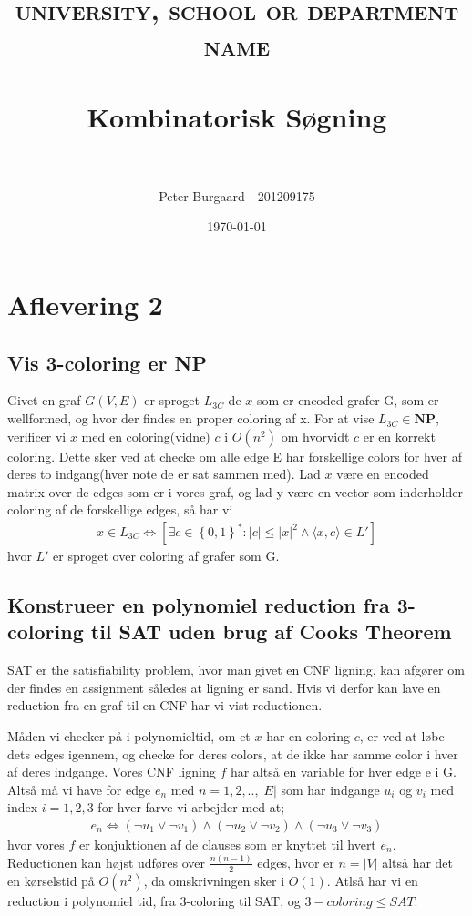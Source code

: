 \documentclass[paper=a4, fontsize=11pt]{scrartcl} %
\title{	
	\normalfont \normalsize 
	\textsc{university, school or department name} \\ [25pt] %
	\horrule{0.5pt} \\[0.4cm] %
	\huge Kombinatorisk Søgning \\ %
	\horrule{2pt} \\[0.5cm] %
}
\author{Peter Burgaard - 201209175} %
\date{\normalsize\today} %
\numberwithin{equation}{section} %
\numberwithin{figure}{section} %
\numberwithin{table}{section} %
\begin{document}
	
	\maketitle %
	
	\section{Aflevering 2}
	
	\subsection{Vis 3-coloring er NP}
	
	Givet en graf $G(V,E)$ er sproget $L_{3C}$ de $x$ som er encoded grafer G, som er wellformed, og hvor der findes en proper coloring af x. For at vise $L_{3C}\in \textbf{NP}$, verificer vi $x$ med en coloring(vidne) $c$ i $O(n^2)$ om hvorvidt $c$ er en korrekt coloring. Dette sker ved at checke om alle edge E har forskellige colors for hver af deres to indgang(hver note de er sat sammen med). Lad $x$ være en encoded matrix over de edges som er i vores graf, og lad y være en vector som inderholder coloring af de forskellige edges, så har vi 
	\begin{align*}
	x\in L_{3C} \iff \left[ \exists c\in \left\lbrace 0,1\right\rbrace ^*:|c|\leq |x|^2 \land \langle x,c \rangle \in L' \right] 
	\end{align*}
	hvor $L'$ er sproget over coloring af grafer som G.
	
	\subsection{Konstrueer en polynomiel reduction fra 3-coloring til SAT uden brug af Cooks Theorem} 
	
	SAT er the satisfiability problem, hvor man givet en CNF ligning, kan afgører om der findes en assignment således at ligning er sand. Hvis vi derfor kan lave en reduction fra en graf til en CNF har vi vist reductionen.
	
	Måden vi checker på i polynomieltid, om et $x$ har en coloring $c$, er ved at løbe dets edges igennem, og checke for deres colors, at de ikke har samme color i hver af deres indgange. Vores CNF ligning $f$ har altså en variable for hver edge e i G. Altså må vi have for edge $e_n$ med $n=1,2,..,|E|$ som har indgange $u_i$ og $v_i$ med index $i=1,2,3$ for hver farve vi arbejder med at;  
	\begin{align*}
	e_n \iff (\lnot u_1\lor\lnot v_1)\land(\lnot u_2\lor\lnot v_2)\land(\lnot u_3\lor\lnot v_3)
	\end{align*}
	hvor vores $f$ er konjuktionen af de clauses som er knyttet til hvert $e_n$. Reductionen kan højst udføres over $\frac{n(n-1)}{2}$ edges, hvor er $n=|V|$ altså har det en kørselstid på $O(n^2)$, da omskrivningen sker i $O(1)$. Atlså har vi en reduction i polynomiel tid, fra 3-coloring til SAT, og $3-coloring \leq SAT$.
\end{document}
